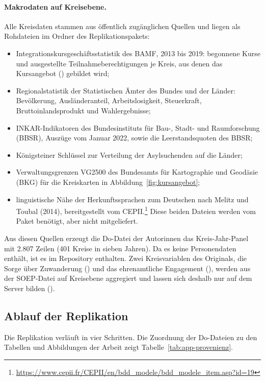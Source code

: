 \paragraph{Makrodaten auf Kreisebene.} Alle Kreisdaten stammen aus öffentlich zugänglichen Quellen und liegen als Rohdateien im Ordner  des Replikationspakets:
\begin{itemize}
  \item Integrationskursgeschäftsstatistik des BAMF, 2013 bis 2019: begonnene Kurse und ausgestellte Teilnahmeberechtigungen je Kreis, aus denen das Kursangebot () gebildet wird;
  \item Regionalstatistik der Statistischen Ämter des Bundes und der Länder: Bevölkerung, Ausländeranteil, Arbeitslosigkeit, Steuerkraft, Bruttoinlandsprodukt und Wahlergebnisse;
  \item INKAR-Indikatoren des Bundesinstituts für Bau-, Stadt- und Raumforschung (BBSR), Auszüge vom Januar 2022, sowie die Leerstandsquoten des BBSR;
  \item Königsteiner Schlüssel zur Verteilung der Asylsuchenden auf die Länder;
  \item Verwaltungsgrenzen VG2500 des Bundesamts für Kartographie und Geodäsie (BKG) für die Kreiskarten in Abbildung~\ref{fig:kursangebot};
  \item linguistische Nähe der Herkunftssprachen zum Deutschen nach Melitz und Toubal (2014), bereitgestellt vom CEPII.\footnote{\url{https://www.cepii.fr/CEPII/en/bdd_modele/bdd_modele_item.asp?id=19}} Diese beiden Dateien werden vom Paket benötigt, aber nicht mitgeliefert.
\end{itemize}

Aus diesen Quellen erzeugt die Do-Datei  der Autorinnen das Kreis-Jahr-Panel  mit 2.807 Zeilen (401 Kreise in sieben Jahren). Da es keine Personendaten enthält, ist es im Repository enthalten. Zwei Kreisvariablen des Originals, die Sorge über Zuwanderung () und das ehrenamtliche Engagement (), werden aus der SOEP-Datei  auf Kreisebene aggregiert und lassen sich deshalb nur auf dem Server bilden ().

\subsection{Ablauf der Replikation}
\label{app:ablauf}

Die Replikation verläuft in vier Schritten. Die Zuordnung der Do-Dateien zu den Tabellen und Abbildungen der Arbeit zeigt Tabelle~\ref{tab:app-provenienz}.

